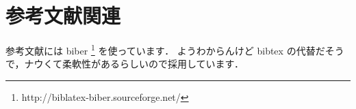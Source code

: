 \section{参考文献関連}

\par 参考文献には biber \footnote{http://biblatex-biber.sourceforge.net/} を使っています．
ようわからんけど bibtex の代替だそうで，ナウくて柔軟性があるらしいので採用しています．
